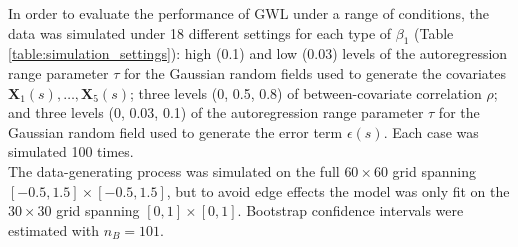 \documentclass[authoryear, review, 11pt]{elsarticle}
\begin{document}
	In order to evaluate the performance of GWL under a range of conditions, the data was simulated under 18 different settings for each type of $\beta_1$ (Table \ref{table:simulation_settings}): high (0.1) and low (0.03) levels of the autoregression range parameter $\tau$ for the Gaussian random fields used to generate the covariates $\bm{X}_1(s), \dots, \bm{X}_5(s)$; three levels (0, 0.5, 0.8) of between-covariate correlation $\rho$; and three levels (0, 0.03, 0.1) of the autoregression range parameter $\tau$ for the Gaussian random field used to generate the error term $\epsilon(s)$. Each case was simulated 100 times.\\
		
	The data-generating process was simulated on the full $60 \times 60$ grid spanning $[-0.5,1.5] \times [-0.5,1.5]$, but to avoid edge effects the model was only fit on the $30 \times 30$ grid spanning $[0,1] \times [0,1]$. Bootstrap confidence intervals were estimated with $n_B = 101$.
		
\end{document}
